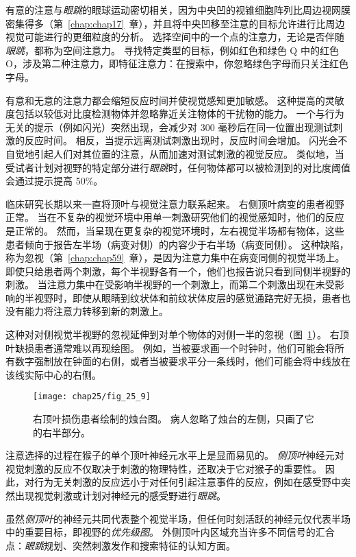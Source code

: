 有意的注意与\textit{眼跳}的眼球运动密切相关，因为中央凹的视锥细胞阵列比周边视网膜密集得多（第~\ref{chap:chap17}~章），并且将中央凹移至注意的目标允许进行比周边视觉可能进行的更细粒度的分析。
选择空间中的一个点的注意力，无论是否伴随\textit{眼跳}，都称为空间注意力。
寻找特定类型的目标，例如红色和绿色 Q 中的红色 O，涉及第二种注意力，即特征注意力：在搜索中，你忽略绿色字母而只关注红色字母。


有意和无意的注意力都会缩短反应时间并使视觉感知更加敏感。
这种提高的灵敏度包括以较低对比度检测物体并忽略靠近关注物体的干扰物的能力。
一个与行为无关的提示（例如闪光）突然出现，会减少对 300 毫秒后在同一位置出现测试刺激的反应时间。
相反，当提示远离测试刺激出现时，反应时间会增加。
闪光会不自觉地引起人们对其位置的注意，从而加速对测试刺激的视觉反应。
类似地，当受试者计划对视野的特定部分进行\textit{眼跳}时，任何物体都可以被检测到的对比度阈值会通过提示提高 50\%。


临床研究长期以来一直将顶叶与视觉注意力联系起来。
右侧顶叶病变的患者视野正常。
当在不复杂的视觉环境中用单一刺激研究他们的视觉感知时，他们的反应是正常的。
然而，当呈现在更复杂的视觉环境时，左右视觉半场都有物体，这些患者倾向于报告左半场（病变对侧）的内容少于右半场（病变同侧）。
这种缺陷，称为忽视（第~\ref{chap:chap59}~章），是因为注意力集中在病变同侧的视觉半场上。
即使只给患者两个刺激，每个半视野各有一个，他们也报告说只看到同侧半视野的刺激。
当注意力集中在受影响半视野的一个刺激上，而第二个刺激出现在未受影响的半视野时，即使从眼睛到纹状体和前纹状体皮层的感觉通路完好无损，患者也没有能力将注意力转移到新的刺激上。


这种对对侧视觉半视野的忽视延伸到对单个物体的对侧一半的忽视（图~\ref{fig:25_9}）。
右顶叶缺损患者通常难以再现绘图。
例如，当被要求画一个时钟时，他们可能会将所有数字强制放在钟面的右侧，或者当被要求平分一条线时，他们可能会将中线放在该线实际中心的右侧。


\begin{figure}[htbp]
	\centering
	\texttt{[image: chap25/fig\_25\_9]}
	\caption{右顶叶损伤患者绘制的烛台图。
		病人忽略了烛台的左侧，只画了它的右半部分。}
	\label{fig:25_9}
\end{figure}


注意选择的过程在猴子的单个顶叶神经元水平上是显而易见的。
\textit{侧顶叶}神经元对视觉刺激的反应不仅取决于刺激的物理特性，还取决于它对猴子的重要性。
因此，对行为无关刺激的反应远小于对任何引起注意事件的反应，例如在感受野中突然出现视觉刺激或计划对神经元的感受野进行\textit{眼跳}。


虽然\textit{侧顶叶}的神经元共同代表整个视觉半场，但任何时刻活跃的神经元仅代表半场中的重要目标，即视野的\textit{优先级图}。
外侧顶叶内区域充当许多不同信号的汇合点：\textit{眼跳}规划、突然刺激发作和搜索特征的认知方面。



